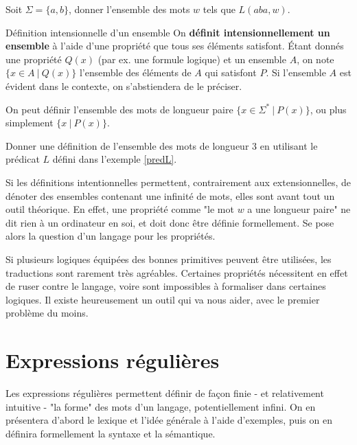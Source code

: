 \begin{exercice}
Soit $\Sigma = \{a,b\}$, donner l'ensemble des mots $w$ tels que $L(aba,w)$. 
\end{exercice}

\begin{definition}{Définition intensionnelle d'un ensemble}{}
On \textbf{définit intensionnellement un ensemble} à l'aide d'une propriété que tous ses éléments satisfont. Étant donnés une propriété $Q(x)$ (par ex. une formule logique) et un ensemble $A$, on note $\{x \in A~|~Q(x)\}$ l'ensemble des éléments de $A$ qui satisfont $P$. Si l'ensemble $A$ est évident dans le contexte, on s'abstiendera de le préciser.
\end{definition}

\begin{example}
On peut définir l'ensemble des mots de longueur paire $\{x \in \Sigma^*~|~P(x)\}$, ou plus simplement $\{x ~|~P(x)\}$.
\end{example}

\begin{exercice}
Donner une définition de l'ensemble des mots de longueur 3 en utilisant le prédicat $L$ défini dans l'exemple \ref{predL}. 
\end{exercice}

Si les définitions intentionnelles permettent, contrairement aux extensionnelles, de dénoter des ensembles contenant une infinité de mots, elles sont avant tout un outil théorique. En effet, une propriété comme "le mot $w$ a une longueur paire" ne dit rien à un ordinateur en soi, et doit donc être définie formellement. Se pose alors la question d'un langage pour les propriétés.

Si plusieurs logiques équipées des bonnes primitives peuvent être utilisées, les traductions sont rarement très agréables. Certaines propriétés nécessitent en effet de ruser contre le langage, voire sont impossibles à formaliser dans certaines logiques. Il existe heureusement un outil qui va nous aider, avec le premier problème du moins.

\chapter{Expressions régulières}
\label{regex}
Les expressions régulières permettent définir de façon finie - et relativement intuitive - "la forme" des mots d'un langage, potentiellement infini. On en présentera d'abord le lexique et l'idée générale à l'aide d'exemples, puis on en définira formellement la syntaxe et la sémantique.

